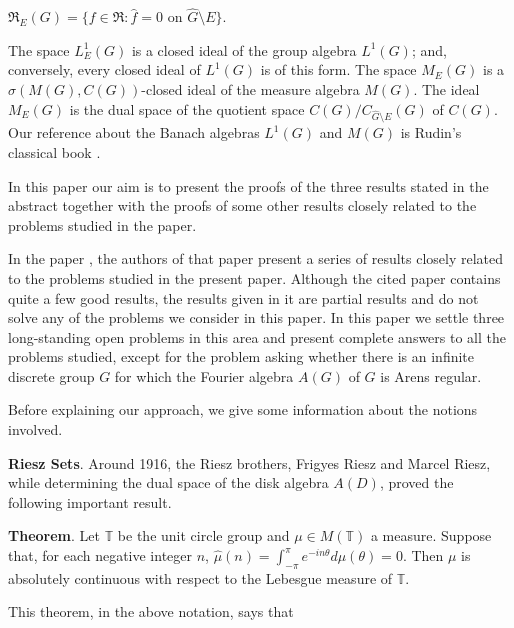 \documentclass[12pt, twoside, leqno]{article}
\theoremstyle{definition}
\theoremstyle{definition}
\numberwithin{equation}{section}
\begin{document}
 $\Re_{E}(G)=\{f\in \Re: \hat{f}=0 \text{ on } \hat{G}\setminus E\} $.\vspace{2mm}  
 
 \noindent The space $ L^{1}_{E}(G) $ is a closed ideal of the group algebra $ L^{1}(G) $; and, conversely, every closed ideal of $ L^{1}(G) $ is of this form. The space $ M_{E}(G) $ is a $ \sigma (M(G),C(G)) $-closed ideal of the measure algebra $ M(G) $. The ideal $ M_{E}(G) $ is the dual space of the quotient space $ C(G)/C_{\hat{G}\setminus E} (G)$ of $ C(G) $. Our reference about the Banach algebras $ L^{1}(G) $ and $ M(G) $ is Rudin's classical book \cite{rudin_01}.\vspace{2mm}
  
In this paper our aim is to present the proofs of the three results stated in the abstract together with the proofs of some other results closely related to the problems studied in the paper.\vspace{2mm}

 In the paper \cite {Esmailvandi_Filali_Galindo}, the authors of that paper present a series of results closely related to the problems studied in the present paper. Although the cited paper contains quite a few good results, the results given in it are partial results and do not solve any of the problems we consider in this paper. In this paper we settle three long-standing open problems in this area and present complete answers to all the problems studied, except for the  problem asking whether there is an infinite discrete group $ G  $ for which the Fourier algebra $ A(G) $ of $ G $ is Arens regular.\vspace{2mm}
 
  Before explaining our approach, we give some information about the notions involved.\vspace{2mm}
 
\textbf{Riesz Sets}. Around 1916, the Riesz brothers, Frigyes Riesz and Marcel Riesz, while determining the dual space of the disk algebra $ A(D) $, proved the following important result.\vspace{2mm}

\textbf{Theorem}. Let $ \mathbb{T} $ be the unit circle group and $ \mu\in M(\mathbb{T}) $ a measure. Suppose that, for each negative integer $ n $, $ \hat{\mu}(n)=\int_{-\pi}^{\pi}e^{-in\theta}d\mu(\theta)=0 $. Then $ \mu $ is absolutely continuous with respect to the Lebesgue measure of $ \mathbb{T} $.\vspace{2mm}

\noindent This theorem, in the above notation, says that\vspace{2mm}
\end{document}
